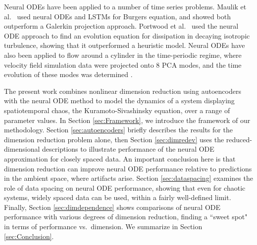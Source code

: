 \documentclass[preprint,aps,pre,letterpaper,onecolumn,superscriptaddress]{revtex4-2} %
\newcommand{\MDG}[1]{\textcolor{magenta}{*** #1 ***}}
\begin{document}
Neural ODEs have been applied to a number of time series problems.  %
Maulik et al.\ \cite{MAULIK2020} used neural ODEs and LSTMs for Burgers equation, and showed both outperform a Galerkin projection approach. %
Portwood et al.\ \cite{portwood2019turbulence} used the neural ODE approach to find an evolution equation for dissipation in decaying isotropic turbulence, showing that it outperformed a heuristic model. Neural ODEs have also been applied to flow around a cylinder in the time-periodic regime, where velocity field simulation data were projected onto 8 PCA modes, and the time evolution of these modes was determined \cite{rojas2021reducedorder}.

The present work combines nonlinear dimension reduction using autoencoders with the neural ODE method to model the dynamics of a system displaying spatiotemporal chaos, the Kuramoto-Sivashinsky equation, over a range of parameter values.  In Section \ref{sec:Framework}, we introduce the framework of our methodology. 
Section \ref{sec:autoencoders} briefly describes the results for the dimension reduction problem alone, then Section \ref{sec:dimredev} uses the reduced-dimensional descriptions to illustrate performance of the neural ODE approximation for closely spaced data.  An important conclusion here is that dimension reduction can improve neural ODE performance relative to predictions in the ambient space, where artifacts arise. Section \ref{sec:dataspacing} examines the role of data spacing on neural ODE performance, showing that even for  chaotic systems, widely spaced data can be used, within a fairly well-defined limit.  Finally, Section \ref{sec:dimdependence} shows comparisons of neural ODE performance with various degrees of dimension reduction, finding a ``sweet spot" in terms of performance vs.\ dimension. We summarize in Section \ref{sec:Conclusion}.
\end{document}
